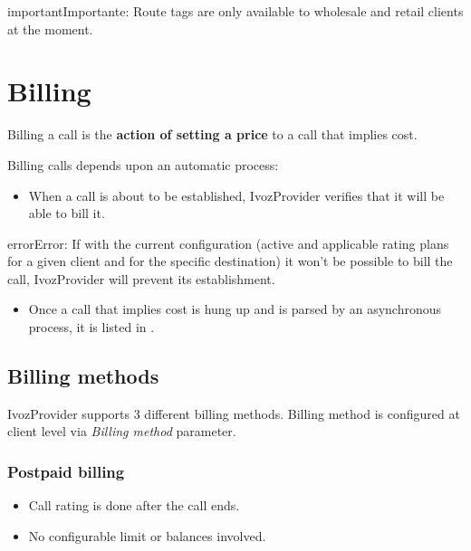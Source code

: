 \documentclass[letterpaper,10pt,spanish]{sphinxmanual}
\begin{document}
\begin{notice}{important}{Importante:}
Route tags are only available to wholesale and retail clients at the moment.
\end{notice}


\section{Billing}
\label{administration_portal/brand/billing/index::doc}\label{administration_portal/brand/billing/index:billing}\label{administration_portal/brand/billing/index:id1}
Billing a call is the \textbf{action of setting a price} to a call that implies cost.

Billing calls depends upon an automatic process:
\begin{itemize}
\item {} 
When a call is about to be established, IvozProvider verifies that it will be able to bill it.

\end{itemize}

\begin{notice}{error}{Error:}
If with the current configuration (active and applicable rating plans for
a given client and for the specific destination) it won't be possible to
bill the call, IvozProvider will prevent its establishment.
\end{notice}
\begin{itemize}
\item {} 
Once a call that implies cost is hung up and is parsed by an asynchronous process, it is listed in {\hyperref[administration_portal/platform/external_calls:id1]{}}.

\end{itemize}


\subsection{Billing methods}
\label{administration_portal/brand/billing/index:billing-methods}
IvozProvider supports 3 different billing methods. Billing method is configured at client level via \emph{Billing method} parameter.


\subsubsection{Postpaid billing}
\label{administration_portal/brand/billing/index:postpaid-billing}\label{administration_portal/brand/billing/index:id2}\begin{itemize}
\item {} 
Call rating is done after the call ends.

\item {} 
No configurable limit or balances involved.

\end{itemize}
\end{document}
